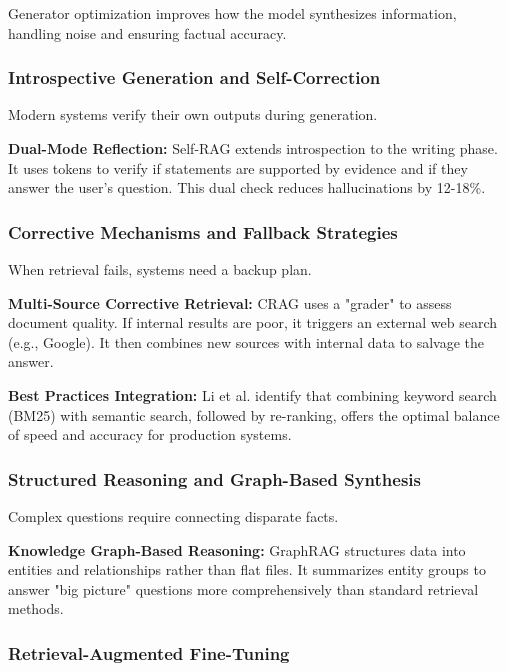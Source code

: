 \documentclass[11pt]{article}
\begin{document}
Generator optimization improves how the model synthesizes information, handling noise and ensuring factual accuracy.

\subsubsection{Introspective Generation and Self-Correction}

Modern systems verify their own outputs during generation.

\textbf{Dual-Mode Reflection:} Self-RAG \citep{asai2024selfrag} extends introspection to the writing phase. It uses tokens to verify if statements are supported by evidence and if they answer the user's question. This dual check reduces hallucinations by 12-18\%.

\subsubsection{Corrective Mechanisms and Fallback Strategies}

When retrieval fails, systems need a backup plan.

\textbf{Multi-Source Corrective Retrieval:} CRAG \citep{yan2024crag} uses a "grader" to assess document quality. If internal results are poor, it triggers an external web search (e.g., Google). It then combines new sources with internal data to salvage the answer.

\textbf{Best Practices Integration:} Li et al. \citep{li2025enhancing} identify that combining keyword search (BM25) with semantic search, followed by re-ranking, offers the optimal balance of speed and accuracy for production systems.

\subsubsection{Structured Reasoning and Graph-Based Synthesis}

Complex questions require connecting disparate facts.

\textbf{Knowledge Graph-Based Reasoning:} GraphRAG \citep{edge2024graphrag} structures data into entities and relationships rather than flat files. It summarizes entity groups to answer "big picture" questions more comprehensively than standard retrieval methods.

\subsubsection{Retrieval-Augmented Fine-Tuning}
\end{document}

